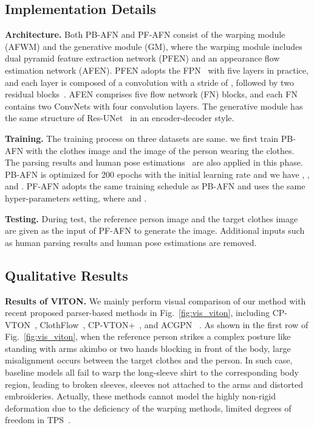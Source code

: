 \documentclass[final]{cvpr}
\begin{document}
	
	\subsection{Implementation Details}
	
	\textbf{Architecture.}
Both PB-AFN and PF-AFN consist of the warping module (AFWM) and the generative module (GM), where the warping module includes dual pyramid feature extraction network (PFEN) and an appearance flow estimation network (AFEN).
PFEN adopts the FPN~\cite{fpn} with five layers in practice, and each layer is composed of a convolution with a stride of , followed by two residual blocks~\cite{resnet}.
AFEN comprises five flow network (FN) blocks, and each FN contains two ConvNets with four convolution layers.
The generative module has the same structure of Res-UNet~\cite{resunet} in an encoder-decoder style.

	\textbf{Training.}
The training process on three datasets are same.
we first train PB-AFN with the clothes image and the image of the person wearing the clothes. The parsing results and human pose estimations~\cite{densepose} are also applied in this phase.
PB-AFN is optimized for 200 epochs with the initial learning rate  and we have , , and .
PF-AFN adopts the same training schedule as PB-AFN and uses the same hyper-parameters setting, where  and .
	
	
	\textbf{Testing.}
During test, the reference person image and the target clothes image are given as the input of PF-AFN to generate the image. Additional inputs such as human parsing results and human pose estimations are removed.
	
	\subsection{Qualitative Results}
	\textbf{Results of VITON.} 
We mainly perform visual comparison of our method with recent proposed parser-based methods in Fig.~\ref{fig:vis_viton}, including CP-VTON~\cite{cpvton}, ClothFlow~\cite{clothflow}, CP-VTON+~\cite{cpvton_plus}, and ACGPN~\cite{ACGPN} .
As shown in the first row of Fig.~\ref{fig:vis_viton}, 
when the reference person strikes a complex posture like standing with arms akimbo or two hands blocking in front of the body, large misalignment occurs between the target clothes and the person.
In such case, baseline models all fail to warp the long-sleeve shirt to the corresponding body region, leading to broken sleeves, sleeves not attached to the arms and distorted embroideries.
Actually, these methods cannot model the highly non-rigid deformation due to the deficiency of the warping methods, \ie limited degrees of freedom in TPS~\cite{tps}. 
	
\end{document}
